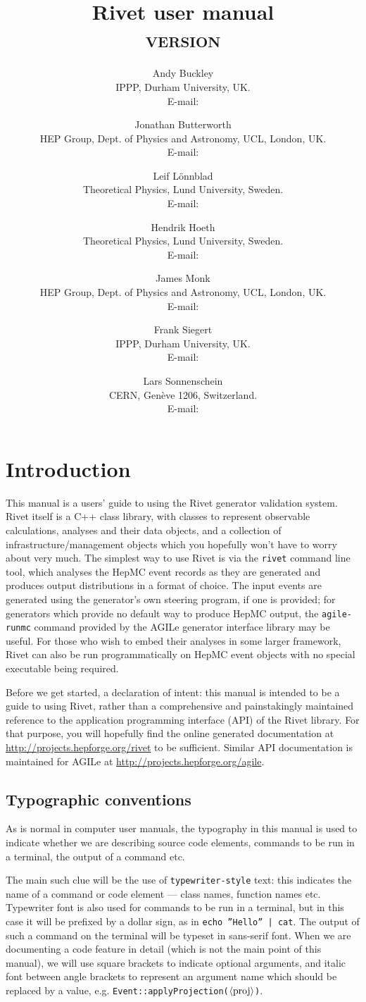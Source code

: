 \documentclass{JHEP3}
\title{Rivet user manual\\ {\smaller \textsc{version \RivetVersion}}}
\author{Andy Buckley\\ IPPP, Durham University, UK.\\ E-mail: \email{andy.buckley@durham.ac.uk}}
\author{Jonathan Butterworth\\ HEP Group, Dept. of Physics and Astronomy, UCL, London, UK.\\ E-mail: \email{J.Butterworth@ucl.ac.uk}}
\author{Leif L\"onnblad\\ Theoretical Physics, Lund University, Sweden.\\ E-mail: \email{lonnblad@thep.lu.se}}
\author{Hendrik Hoeth\\ Theoretical Physics, Lund University, Sweden.\\ E-mail: \email{hendrik.hoeth@cern.ch}}
\author{James Monk\\ HEP Group, Dept. of Physics and Astronomy, UCL, London, UK.\\ E-mail: \email{jmonk@hep.ucl.ac.uk}}
\author{Frank Siegert\\ IPPP, Durham University, UK.\\ E-mail: \email{frank.siegert@durham.ac.uk}}
\author{Lars Sonnenschein\\ CERN, Gen\`eve 1206, Switzerland.\\ E-mail: \email{sonne@cern.ch}}
\newcommand{\kbd}[1]{\texttt{#1}\xspace}
\newcommand{\inp}[1]{\textsf{\textdollar}\hspace{1mm}\texttt{#1}\xspace}
\newcommand{\outp}[1]{\textsf{#1}\xspace}
\newcommand{\code}[1]{\texttt{#1}\xspace}
\newcommand{\val}[1]{\textit{\ensuremath{\langle\text{\textrm{#1}\/}\rangle}}\xspace}
\begin{document}
 


\section{Introduction}
This manual is a users' guide to using the Rivet generator validation
system. Rivet itself is a C++ class library, with classes to represent
observable calculations, analyses and their data objects, and a collection of
infrastructure/management objects which you hopefully won't have to worry about
very much. The simplest way to use Rivet is via the \kbd{rivet} command line
tool, which analyses the HepMC event records as they are generated and produces
output distributions in a format of choice. The input events are generated using
the generator's own steering program, if one is provided; for generators which
provide no default way to produce HepMC output, the \kbd{agile-runmc} command
provided by the AGILe generator interface library may be useful. For those who
wish to embed their analyses in some larger framework, Rivet can also be run
programmatically on HepMC event objects with no special executable being
required.

Before we get started, a declaration of intent: this manual is intended to be a
guide to using Rivet, rather than a comprehensive and painstakingly maintained
reference to the application programming interface (API) of the Rivet
library. For that purpose, you will hopefully find the online generated
documentation at \url{http://projects.hepforge.org/rivet} to be
sufficient. Similar API documentation is maintained for AGILe at
\url{http://projects.hepforge.org/agile}.


\subsection{Typographic conventions}
As is normal in computer user manuals, the typography in this manual is used to
indicate whether we are describing source code elements, commands to be run in a
terminal, the output of a command etc.

The main such clue will be the use of \kbd{typewriter-style} text: this
indicates the name of a command or code element --- class names, function names
etc. Typewriter font is also used for commands to be run in a terminal, but in
this case it will be prefixed by a dollar sign, as in \inp{echo ''Hello'' |
  cat}.  The output of such a command on the terminal will be typeset in
\outp{sans-serif} font. When we are documenting a code feature in detail (which
is not the main point of this manual), we will use square brackets to indicate
optional arguments, and italic font between angle brackets to represent an
argument name which should be replaced by a value,
e.g. \code{Event::applyProjection(\val{proj})}.
\end{document}
